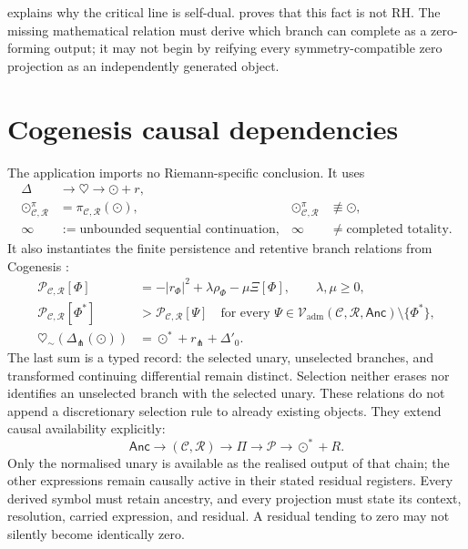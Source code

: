 \documentclass[11pt,a4paper]{article}
\theoremstyle{definition}
\newcommand{\heartsim}{\heartsuit_{\sim}}
\newcommand{\Cctx}{\mathcal{C}}
\newcommand{\Rres}{\mathcal{R}}
\newcommand{\Persist}{\mathcal{P}}
\newcommand{\DeltaFork}{\Delta_{\pitchfork}}
\newcommand{\Admissible}{\mathcal{V}_{\mathrm{adm}}}
\begin{document}
\begin{reviewbox}
 explains why the critical line is self-dual.
 proves that this fact is not RH. The missing
mathematical relation must derive which branch can complete as a zero-forming
output; it may not begin by reifying every symmetry-compatible zero projection
as an independently generated object.
\end{reviewbox}

\section{Cogenesis causal dependencies}
\label{sec:cogenesis-dependencies}

The application imports no Riemann-specific conclusion. It uses
\begin{align}
\label{eq:imported-process}
  \Delta&\longrightarrow\heartsuit\longrightarrow\odot+r,\\
\label{eq:imported-projection}
  \odot^\pi_{\Cctx,\Rres}
  &=\pi_{\Cctx,\Rres}(\odot),
  &\odot^\pi_{\Cctx,\Rres}&\not\equiv\odot,\\
\label{eq:imported-continuation}
  \infty&:=\text{unbounded sequential continuation},
  &\infty&\neq\text{completed totality}.
\end{align}
It also instantiates the finite persistence and retentive branch relations from
Cogenesis \parencite{petrik2026concise}:
\begin{align}
\label{eq:imported-persistence}
  \Persist_{\Cctx,\Rres}[\Phi]
  &=-|r_\Phi|^2+\lambda\rho_\Phi-\mu\Xi[\Phi],
  \qquad \lambda,\mu\geq0,\\
\label{eq:imported-finite-selection}
  \Persist_{\Cctx,\Rres}[\Phi^\ast]
  &>\Persist_{\Cctx,\Rres}[\Psi]
  \quad
  \text{for every }\Psi\in
  \Admissible(\Cctx,\Rres,\mathsf{Anc})\setminus\{\Phi^\ast\},\\
\label{eq:imported-branch-normalisation}
  \heartsim\!\left(\DeltaFork(\odot)\right)
  &=\odot^\ast+r_{\pitchfork}+\Delta'_0.
\end{align}
The last sum is a typed record: the selected unary, unselected branches, and
transformed continuing differential remain distinct. Selection neither erases
nor identifies an unselected branch with the selected unary.
These relations do not append a discretionary selection rule to already
existing objects. They extend causal availability explicitly:
\[
  \mathsf{Anc}
  \longrightarrow
  (\Cctx,\Rres)
  \longrightarrow
  \Pi
  \longrightarrow
  \Persist
  \longrightarrow
  \odot^\ast+R.
\]
Only the normalised unary is available as the realised output of that chain;
the other expressions remain causally active in their stated residual
registers.
Every derived symbol must retain ancestry, and every projection must state its
context, resolution, carried expression, and residual. A residual tending to
zero may not silently become identically zero.
\end{document}
